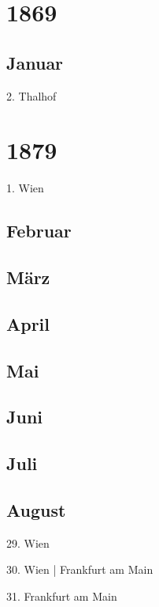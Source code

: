 \documentclass[twoside=false,titlepage=false,open=any, parskip=never, fontsize=10pt, headings=small, chapterprefix=false, appendixprefix=false, DIV=15]{scrbook}
\begin{document}
\begin{multicols}{3}
    \chapter*{1869}\section*{Januar}
            2. Thalhof\par
            \chapter*{1879}
            1. Wien\par
            \section*{Februar}
            \section*{März}
            \section*{April}
            \section*{Mai}
            \section*{Juni}
            \section*{Juli}
            \section*{August}
            29. Wien\par
            30. Wien | Frankfurt am Main\par
            31. Frankfurt am Main\par

\end{multicols}
\end{document}
